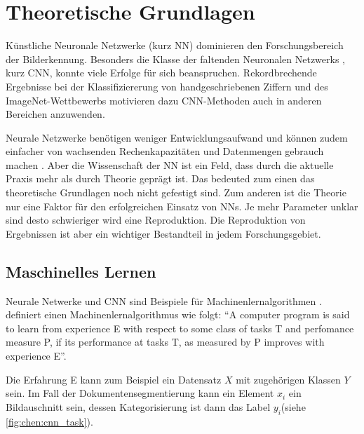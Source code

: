 \chapter{Theoretische Grundlagen}
\label{chap:theorie}
Künstliche Neuronale Netzwerke (kurz NN) dominieren den Forschungsbereich der 
Bilderkennung. 
Besonders die Klasse der faltenden Neuronalen Netzwerks , kurz CNN, konnte viele Erfolge für sich beanspruchen.
Rekordbrechende Ergebnisse bei der Klassifiziererung von handgeschriebenen Ziffern \parencite{LeCunBackpropagationappliedhandwritten1989} und des ImageNet-Wettbewerbs \parencite{KrizhevskyImageNetClassificationDeep2012} motivieren dazu CNN-Methoden auch in anderen
Bereichen anzuwenden.


Neurale Netzwerke benötigen weniger Entwicklungsaufwand und können zudem einfacher von 
 wachsenden Rechenkapazitäten und Datenmengen gebrauch machen \parencite[436]{LeCunDeeplearning2015}. 
Aber die Wissenschaft der NN ist ein Feld, dass durch die aktuelle Praxis mehr als durch Theorie geprägt ist. 
Das bedeuted zum einen das theoretische Grundlagen noch nicht gefestigt sind.
Zum anderen ist die Theorie nur eine Faktor für den erfolgreichen Einsatz von NNs. 
Je mehr Parameter unklar sind desto schwieriger wird eine Reproduktion.
Die Reproduktion von Ergebnissen ist aber ein wichtiger Bestandteil in jedem Forschungsgebiet. 

\section{Maschinelles Lernen}
Neurale Netwerke und CNN sind Beispiele für Machinenlernalgorithmen .
\cite{MitchellMachinelearning1997} definiert einen Machinenlernalgorithmus wie folgt: ``A computer program is said to learn from experience E with respect to some class of tasks T and perfomance measure P, if its performance at tasks T, as measured by P improves with experience E''.

Die Erfahrung E kann zum Beispiel ein Datensatz \(X\) mit zugehörigen Klassen
\(Y\) sein. Im Fall der Dokumentensegmentierung kann ein Element \(x_i\) ein Bildauschnitt sein, 
dessen Kategorisierung ist dann das Label \(y_i\)(siehe \cref{fig:chen:cnn_task}).


